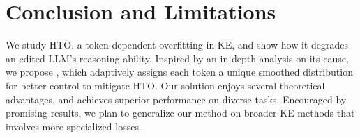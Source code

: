 \section{Conclusion and Limitations}
\label{sec:conclusion}



We study HTO, a token-dependent overfitting in KE, and show how it degrades an edited LLM’s reasoning ability. 
Inspired by an in-depth analysis on its cause, we propose {\NAME}, which adaptively assigns each token a unique smoothed distribution for better control to mitigate HTO. 
Our solution enjoys several theoretical advantages, and achieves superior performance on diverse tasks. 
Encouraged by promising results, we plan to generalize our method on broader KE methods that involves more specialized losses.